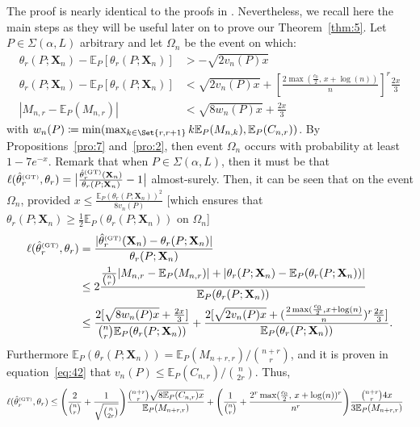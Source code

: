 \documentclass{article}
\newcommand{\1}{\boldsymbol{1}}
\newcommand{\EE}{\mathbb{E}}
\theoremstyle{plain}
\begin{document}
The proof is nearly identical to the proofs in \cite{Ben(17)}. Nevertheless, we recall here the main steps as they will be useful later on to prove our Theorem~\ref{thm:5}.  Let $P\in \Sigma(\alpha,L)$ arbitrary and let $\Omega_n$ be the event on which:
  \begin{align*}
    \theta_r(P;\mathbf{X}_n) - \EE_P[\theta_r(P;\mathbf{X}_n)]%
    &> -\sqrt{2v_n(P)x}\\
    \theta_r(P;\mathbf{X}_n) - \EE_P[\theta_r(P;\mathbf{X}_n)] &< \sqrt{2v_n(P)x} + \left[\frac{2\max(\frac{c_0}{2},\, x + \log(n))}{n} \right]^r \frac{2x}{3}\\
    |M_{n,r} - \EE_P(M_{n,r})|
    &< \sqrt{8w_n(P)x} + \frac{2x}{3}
  \end{align*}
  with $w_n(P) \coloneqq \min( \max_{k\in\Set{r,r+1}}k\EE_P(M_{n,k}) ,\EE_P(C_{n,r}))$. By Propositions~\ref{pro:7} and~\ref{pro:2}, then event $\Omega_n$ occurs with probability at least $1 - 7e^{-x}$. Remark that when $P \in \Sigma(\alpha,L)$, then it must be that $\ell(\hat{\theta}_r^{\text{\tiny{(GT)}}},\theta_r) = \big|\frac{\hat{\theta}_r^{\text{\tiny{(GT)}}}(\mathbf{X}_n)}{\theta_r(P;\mathbf{X}_n)} - 1 \big|$ almost-surely. Then, it can be seen that on the event $\Omega_n$, provided $x \leq \frac{\EE_P(\theta_r(P;\mathbf{X}_n))^2}{8 v_n(P)}$ [which ensures that $\theta_r(P;\mathbf{X}_n) \geq \frac{1}{2}\EE_P(\theta_r(P;\mathbf{X}_n))$ on $\Omega_n$]
  \begin{align*}
    \ell(\hat{\theta}_r^{\text{\tiny{(GT)}}},\theta_r)%
    &= \frac{|\hat{\theta}_r^{\text{\tiny{(GT)}}}(\mathbf{X}_n) - \theta_r(P;\mathbf{X}_n)|}{\theta_r(P;\mathbf{X}_n)}\\
    &\leq%
      2\frac{\frac{1}{\binom{n}{r}} |M_{n,r} - \EE_P(M_{n,r})| + |\theta_r(P;\mathbf{X}_n) - \EE_P(\theta_r(P;\mathbf{X}_n))|}{\EE_P(\theta_r(P;\mathbf{X}_n))}\\
    &\leq%
      \frac{2[\sqrt{8w_n(P)x} + \frac{2x}{3}]}{\binom{n}{r}\EE_P(\theta_r(P;\mathbf{X}_n))}%
      + \frac{2[\sqrt{2v_n(P)x} + (\frac{2\max(\frac{c_0}{2}, x + \log(n)}{n})^r\frac{2x}{3}]}{\EE_P(\theta_r(P;\mathbf{X}_n))}.
  \end{align*}
  Furthermore $\EE_P(\theta_r(P;\mathbf{X}_n)) = \EE_P(M_{n+r,r})/\binom{n+r}{r}$, and it is proven in equation~\ref{eq:42} that $v_n(P) \leq \EE_P(C_{n,r})/\binom{n}{2r} $. Thus,
  \begin{align*}
    \ell(\hat{\theta}_r^{\text{\tiny{(GT)}}},\theta_r)%
    &\leq \Bigg(\frac{2}{\binom{n}{r}} + \frac{1}{\sqrt{\binom{n}{2r}}} \Bigg) \frac{\binom{n+r}{r}\sqrt{8\EE_P(C_{n,r})x}}{\EE_P(M_{n+r,r})}%
      + \Bigg(\frac{1}{\binom{n}{r}}%
      + \frac{2^r\max(\frac{c_0}{2},\,x+\log(n))^r}{n^r}%
      \Bigg)\frac{\binom{n+r}{r}4x}{3\EE_P(M_{n+r,r})}
  \end{align*}
\end{document}

